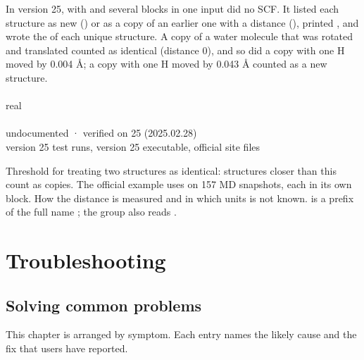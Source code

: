 \documentclass[letterpaper,10pt,english,openany,oneside]{sphinxmanual}
\begin{document}
\sphinxAtStartPar
{} 

\sphinxAtStartPar
In version 25,  with  and several  blocks in one input did no SCF. It listed each
structure as new () or as a copy of an earlier one with a distance (),
printed , and wrote the  of each unique structure. A copy of a water molecule that
was rotated and translated counted as identical (distance 0), and so did a copy with one H moved by 0.004 Å; a
copy with one H moved by 0.043 Å counted as a new structure.


\subsection{}
\label{\detokenize{reference/uniq:distance}}\label{\detokenize{reference/uniq:uniq-distance}}
\ignorespaces 
\sphinxAtStartPar
{} real\\
 \\
 undocumented · verified on 25 (2025.02.28)\\
 version 25 test runs, version 25 executable, official site files

\sphinxAtStartPar
Threshold for treating two structures as identical: structures closer than this count as copies. The official
example uses  on 157 MD snapshots, each in its own  block. How the distance is measured
and in which units is not known.  is a prefix of the full name ; the group also reads .

\part{Troubleshooting}

\sphinxstepscope


\chapter{Solving common problems}
\label{\detokenize{troubleshooting/common-problems:solving-common-problems}}\label{\detokenize{troubleshooting/common-problems:troubleshooting-common-problems}}\label{\detokenize{troubleshooting/common-problems::doc}}
\sphinxAtStartPar
This chapter is arranged by symptom. Each entry names the likely cause and the fix that users have reported.
\end{document}
